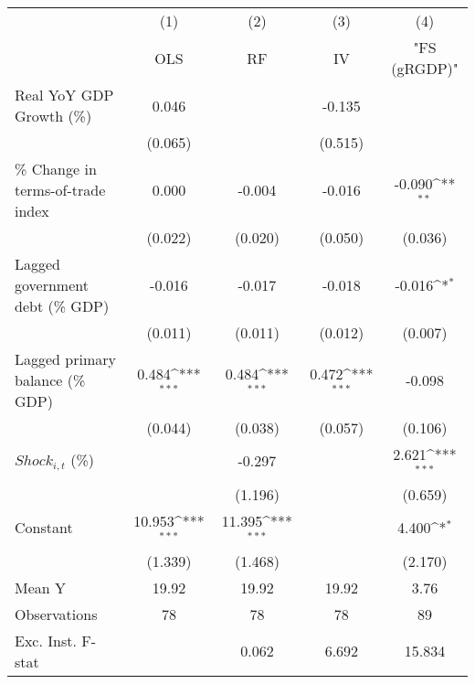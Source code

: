 {
\def\sym#1{\ifmmode^{#1}\else\(^{#1}\)\fi}
\begin{tabular}{l*{4}{c}}
\toprule
                    &\multicolumn{1}{c}{(1)}&\multicolumn{1}{c}{(2)}&\multicolumn{1}{c}{(3)}&\multicolumn{1}{c}{(4)}\\
                    &\multicolumn{1}{c}{OLS}&\multicolumn{1}{c}{RF}&\multicolumn{1}{c}{IV}&\multicolumn{1}{c}{ "FS (gRGDP)" }\\
\midrule
Real YoY GDP Growth (\%)&       0.046         &                     &      -0.135         &                     \\
                    &     (0.065)         &                     &     (0.515)         &                     \\
\addlinespace
\% Change in terms-of-trade index&       0.000         &      -0.004         &      -0.016         &      -0.090\sym{**} \\
                    &     (0.022)         &     (0.020)         &     (0.050)         &     (0.036)         \\
\addlinespace
Lagged government debt (\% GDP)&      -0.016         &      -0.017         &      -0.018         &      -0.016\sym{*}  \\
                    &     (0.011)         &     (0.011)         &     (0.012)         &     (0.007)         \\
\addlinespace
Lagged primary balance (\% GDP)&       0.484\sym{***}&       0.484\sym{***}&       0.472\sym{***}&      -0.098         \\
                    &     (0.044)         &     (0.038)         &     (0.057)         &     (0.106)         \\
\addlinespace
$ Shock_{i,t}$ (\%) &                     &      -0.297         &                     &       2.621\sym{***}\\
                    &                     &     (1.196)         &                     &     (0.659)         \\
\addlinespace
Constant            &      10.953\sym{***}&      11.395\sym{***}&                     &       4.400\sym{*}  \\
                    &     (1.339)         &     (1.468)         &                     &     (2.170)         \\
\midrule
Mean Y              &       19.92         &       19.92         &       19.92         &        3.76         \\
Observations        &          78         &          78         &          78         &          89         \\
Exc. Inst. F-stat   &                     &       0.062         &       6.692         &      15.834         \\
\bottomrule
\end{tabular}
}
